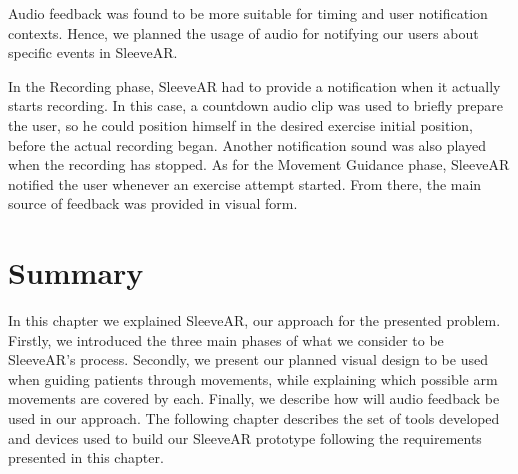 Audio feedback was found to be more suitable for timing and user notification contexts. 
Hence, we planned the usage of audio for notifying our users about specific events in SleeveAR.

In the Recording phase, SleeveAR had to provide a notification when it actually starts recording. 
In this case, a countdown audio clip was used to briefly prepare the user, so he could
position himself in the desired exercise initial position, before the actual recording began. 
Another notification sound was also played when the recording has stopped.
As for the Movement Guidance phase, SleeveAR notified the user whenever an exercise attempt started. 
From there, the main source of feedback was provided in visual form.

\section{Summary}

In this chapter we explained SleeveAR, our approach for the presented problem. Firstly, we introduced the three main phases of what we consider to be
SleeveAR's process. Secondly, we present our planned visual design to be used when guiding patients through movements, while explaining which possible arm movements are covered by each. Finally, we describe how will audio feedback be used in our approach.
The following chapter describes the set of tools developed and devices used to build our SleeveAR prototype following the requirements presented in this chapter.
